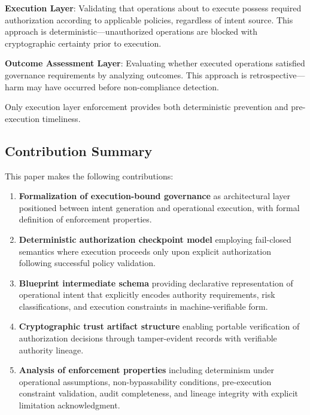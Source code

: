 \documentclass[11pt,letterpaper]{article}
\begin{document}
\textbf{Execution Layer}: Validating that operations about to execute possess required authorization according to applicable policies, regardless of intent source. This approach is deterministic---unauthorized operations are blocked with cryptographic certainty prior to execution.

\textbf{Outcome Assessment Layer}: Evaluating whether executed operations satisfied governance requirements by analyzing outcomes. This approach is retrospective---harm may have occurred before non-compliance detection.

Only execution layer enforcement provides both deterministic prevention and pre-execution timeliness.

\subsection{Contribution Summary}

This paper makes the following contributions:

\begin{enumerate}
\item \textbf{Formalization of execution-bound governance} as architectural layer positioned between intent generation and operational execution, with formal definition of enforcement properties.

\item \textbf{Deterministic authorization checkpoint model} employing fail-closed semantics where execution proceeds only upon explicit authorization following successful policy validation.

\item \textbf{Blueprint intermediate schema} providing declarative representation of operational intent that explicitly encodes authority requirements, risk classifications, and execution constraints in machine-verifiable form.

\item \textbf{Cryptographic trust artifact structure} enabling portable verification of authorization decisions through tamper-evident records with verifiable authority lineage.

\item \textbf{Analysis of enforcement properties} including determinism under operational assumptions, non-bypassability conditions, pre-execution constraint validation, audit completeness, and lineage integrity with explicit limitation acknowledgment.
\end{enumerate}
\end{document}

